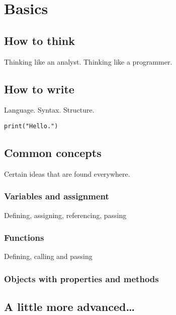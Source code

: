\chapter{Basics}
\label{chapter:basics}

\section{How to think}

Thinking like an analyst. Thinking like a programmer.

\section{How to write}

Language. Syntax. Structure.

\begin{verbatim}
print("Hello.")
\end{verbatim}

\section{Common concepts}

Certain ideas that are found everywhere.

\subsection{Variables and assignment}

Defining, assigning, referencing, passing

\subsection{Functions}

Defining, calling and passing

\subsection{Objects with properties and methods}

\section{A little more advanced\ldots}

